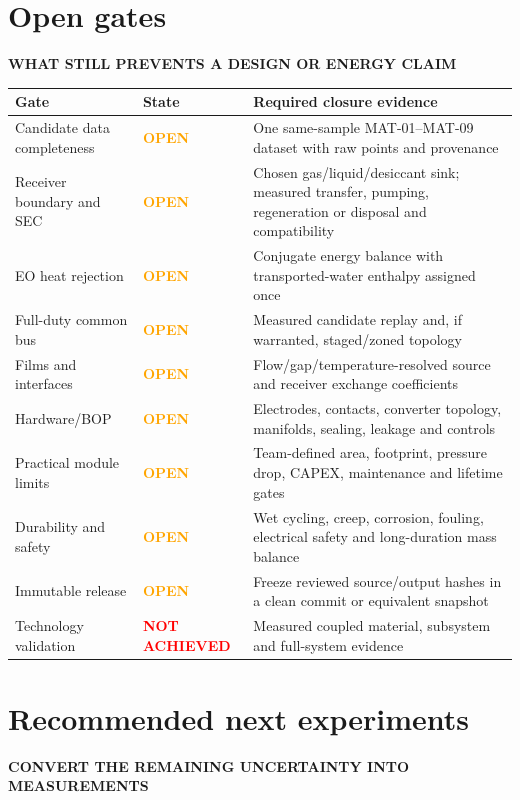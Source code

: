 \documentclass[10pt,a4paper]{article}
\newcommand{\sans}{\fontfamily{qhv}\selectfont}
\newcommand{\eyebrow}[1]{%
  {\sans\bfseries\color{Teal}\MakeUppercase{#1}}\par\vspace{1.5mm}%
}
\begin{document}
\section{Open gates}
\eyebrow{What still prevents a design or energy claim}

\begin{center}\small
\begin{tabularx}{\textwidth}{@{}p{40mm}p{22mm}Y@{}}
\toprule
\textbf{Gate} & \textbf{State} & \textbf{Required closure evidence} \\
\midrule
Candidate data completeness & \textcolor{Orange}{\textbf{OPEN}} &
One same-sample MAT-01--MAT-09 dataset with raw points and provenance \\
Receiver boundary and SEC & \textcolor{Orange}{\textbf{OPEN}} &
Chosen gas/liquid/desiccant sink; measured transfer, pumping, regeneration or
disposal and compatibility \\
EO heat rejection & \textcolor{Orange}{\textbf{OPEN}} &
Conjugate energy balance with transported-water enthalpy assigned once \\
Full-duty common bus & \textcolor{Orange}{\textbf{OPEN}} &
Measured candidate replay and, if warranted, staged/zoned topology \\
Films and interfaces & \textcolor{Orange}{\textbf{OPEN}} &
Flow/gap/temperature-resolved source and receiver exchange coefficients \\
Hardware/BOP & \textcolor{Orange}{\textbf{OPEN}} &
Electrodes, contacts, converter topology, manifolds, sealing, leakage and controls \\
Practical module limits & \textcolor{Orange}{\textbf{OPEN}} &
Team-defined area, footprint, pressure drop, CAPEX, maintenance and lifetime gates \\
Durability and safety & \textcolor{Orange}{\textbf{OPEN}} &
Wet cycling, creep, corrosion, fouling, electrical safety and long-duration mass balance \\
Immutable release & \textcolor{Orange}{\textbf{OPEN}} &
Freeze reviewed source/output hashes in a clean commit or equivalent snapshot \\
Technology validation & \textcolor{Red}{\textbf{NOT ACHIEVED}} &
Measured coupled material, subsystem and full-system evidence \\
\bottomrule
\end{tabularx}
\end{center}

\section{Recommended next experiments}
\eyebrow{Convert the remaining uncertainty into measurements}
\end{document}
